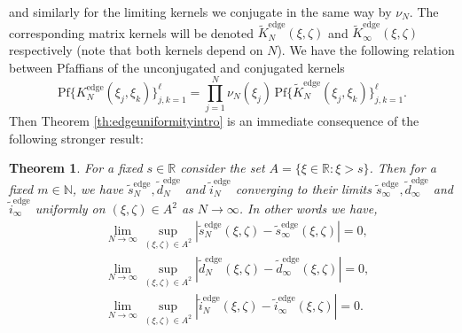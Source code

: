\documentclass[11pt,reqno]{amsproc}
\newtheorem{theorem}{Theorem}
\numberwithin{equation}{section}
\numberwithin{theorem}{section}
\begin{document}
and similarly for the limiting kernels we conjugate in the same way by $\nu_{N}$. The corresponding matrix kernels will be denoted $\tilde{K}^{\mathrm{edge}}_{N}(\xi,\zeta)$ and $\tilde{K}_{\infty}^{\mathrm{edge}}(\xi,\zeta)$ respectively (note that both kernels depend on $N$). We have the following relation between Pfaffians of the unconjugated and conjugated kernels
\begin{equation}
\mathrm{Pf}\bigg\{K^{\mathrm{edge}}_{N}(\xi_{j},\xi_{k})\bigg\}_{j,k=1}^{\ell} = \prod_{j=1}^{N}\nu_{N}(\xi_j)\,\mathrm{Pf}\bigg\{\tilde{K}^{\mathrm{edge}}_{N}(\xi_{j},\xi_{k})\bigg\}_{j,k=1}^{\ell}.
\label{nupfaffident}
\end{equation}
Then Theorem \ref{th:edgeuniformityintro} is an immediate consequence of the following stronger result:
\begin{theorem}
\label{th:edgeuniformity}
For a fixed $s \in \mathbb{R}$ consider the set $A = \{ \xi \in \mathbb{R} : \xi > s\}$. Then for a fixed $m \in \mathbb{N}$, we have $\tilde{s}_{N}^{\mathrm{edge}}, \tilde{d}_{N}^{\mathrm{edge}}$ and $\tilde{i}_{N}^{\mathrm{edge}}$ converging to their limits $\tilde{s}_{\infty}^{\mathrm{edge}}, \tilde{d}_{\infty}^{\mathrm{edge}}$ and $\tilde{i}_{\infty}^{\mathrm{edge}}$ uniformly on $(\xi,\zeta) \in A^{2}$ as $N \to \infty$. In other words we have,
\begin{align}
&\lim_{N \to \infty}\sup_{(\xi,\zeta) \in A^{2}}|\tilde{s}_{N}^{\mathrm{edge}}(\xi,\zeta) - \tilde{s}_{\infty}^{\mathrm{edge}}(\xi,\zeta)| = 0, \label{tildesconv}\\
&\lim_{N \to \infty}\sup_{(\xi,\zeta) \in A^{2}}|\tilde{d}_{N}^{\mathrm{edge}}(\xi,\zeta) - \tilde{d}_{\infty}^{\mathrm{edge}}(\xi,\zeta)| = 0, \label{tildedconv}\\
&\lim_{N \to \infty}\sup_{(\xi,\zeta) \in A^{2}}|\tilde{i}_{N}^{\mathrm{edge}}(\xi,\zeta) - \tilde{i}_{\infty}^{\mathrm{edge}}(\xi,\zeta)| = 0. \label{tildeiconv}
\end{align}

\end{theorem}
\end{document}
